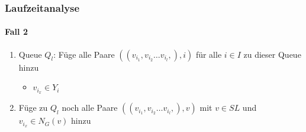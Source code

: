 \begin{frame}
\frametitle{Laufzeitanalyse}
\framesubtitle{Fall 2}

\begin{enumerate}
	\item Queue $Q_l$: Füge alle Paare $((v_{i_1}, v_{i_2} \dots v_{i_l},), i)$ für alle $i \in I$ zu dieser Queue hinzu
	\begin{itemize}
		\item $v_{i_x} \in Y_i$
	\end{itemize}
	
	\item Füge zu $Q_l$ noch alle Paare $((v_{i_1}, v_{i_2} \dots v_{i_l},), v)$ mit $v \in SL$ und $v_{i_x} \in N_G(v)$ hinzu 
\end{enumerate}

\end{frame}


